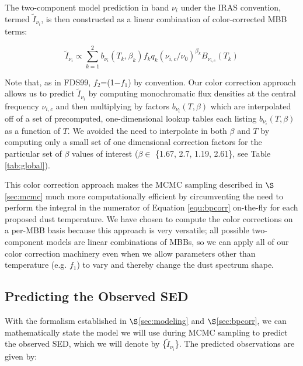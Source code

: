 \documentclass{emulateapj}
\newcommand{\IRAS}{{\it IRAS}}
\begin{document}
The two-component model prediction in band $\nu_i$ under the IRAS convention, 
termed $\tilde{I}_{\nu_i}$, is then constructed as a linear combination of 
color-corrected MBB terms:

\begin{equation} \label{equ:iras}
\tilde{I}_{\nu_i} \propto \sum_{k=1}^{2} b_{\nu_i}(T_k, \beta_k) f_k q_k (\nu_{i,c}/\nu_0)^{\beta_k} B_{\nu_{i,c}}(T_k)
\end{equation}

Note that, as in FDS99, $f_2$=(1$-$$f_1$) by convention. Our color correction 
approach allows us to predict $\tilde{I}_{\nu_i}$ by computing monochromatic 
flux densities at the central frequency $\nu_{i,c}$ and then multiplying by 
factors $b_{\nu_i}(T, \beta)$ which are interpolated off of a set of 
precomputed, one-dimensional lookup tables each listing $b_{\nu_i}(T, \beta)$ 
as a function of $T$. We avoided the need to interpolate in both $\beta$ and 
$T$ by computing only a small set of one dimensional correction factors for the
particular set of $\beta$ values of interest 
($\beta \in$ \{1.67, 2.7, 1.19, 2.61\}, see Table \ref{tab:global}).


This color correction approach makes the MCMC sampling described in 
$\S$\ref{sec:mcmc} much more computationally efficient by circumventing the 
need to perform the integral in the numerator of Equation \ref{equ:bpcorr} 
on-the-fly for each proposed dust temperature. We have chosen to compute the 
color corrections on a per-MBB basis because this approach is very 
versatile; all possible two-component models are linear combinations of MBBs, 
so we can apply all of our color correction machinery even when we allow 
parameters other than temperature (e.g. $f_1$) to vary and thereby change the 
dust spectrum shape.


\subsection{Predicting the Observed SED}
With the formalism established in $\S$\ref{sec:modeling} and 
$\S$\ref{sec:bpcorr}, we can mathematically state the model we will use during 
MCMC sampling to predict the observed SED, which we will denote by 
\{$\tilde{I}_{\nu_i}$\}. The predicted observations are given by:
\end{document}
